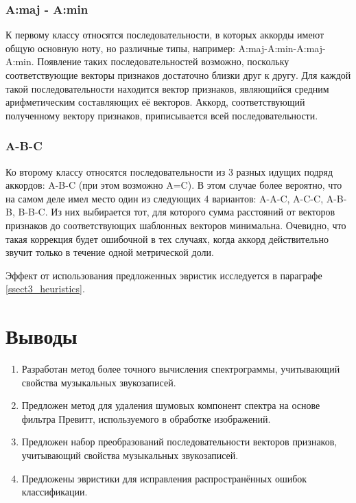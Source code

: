 \subsubsection{A:maj - A:min}

К первому классу относятся последовательности, в которых аккорды имеют общую
основную ноту, но различные типы, например: A:maj-A:min-A:maj-A:min. Появление
таких последовательностей возможно, поскольку соответствующие векторы признаков
достаточно близки друг к другу. Для каждой такой последовательности находится
вектор признаков, являющийся средним арифметическим составляющих её векторов.
Аккорд, соответствующий полученному вектору признаков, приписывается всей
последовательности.

\subsubsection{A-B-C}

Ко второму классу относятся последовательности из 3 разных идущих подряд
аккордов: A-B-C (при этом возможно A=C). В этом случае более вероятно, что на
самом деле имел место один из следующих 4 вариантов: A-A-C, A-C-C, A-B-B,
B-B-C. Из них выбирается тот, для которого сумма расстояний от векторов
признаков до соответствующих шаблонных векторов минимальна. Очевидно, что такая
коррекция будет ошибочной в тех случаях, когда аккорд действительно звучит
только в течение одной метрической доли.

Эффект от использования предложенных эвристик исследуется в параграфе
\ref{ssect3_heuristics}.

\section{Выводы}

\begin{enumerate}
  \item Разработан метод более точного вычисления спектрограммы, учитывающий
  свойства музыкальных звукозаписей.
  \item Предложен метод для удаления шумовых компонент спектра на основе фильтра
  Превитт, используемого в обработке изображений.
  \item Предложен набор преобразований последовательности векторов признаков,
  учитывающий свойства музыкальных звукозаписей.
  \item Предложены эвристики для исправления распространённых ошибок
  классификации.
\end{enumerate}


\clearpage